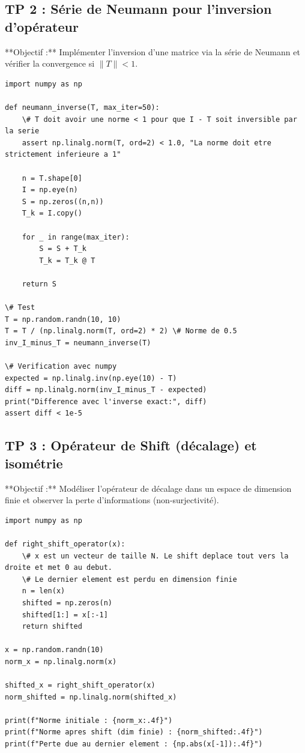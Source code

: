 \documentclass[11pt,a4paper]{article}
\begin{document}
\subsection*{TP 2 : Série de Neumann pour l'inversion d'opérateur}

**Objectif :**
Implémenter l'inversion d'une matrice via la série de Neumann et vérifier la convergence si $\|T\| < 1$.

\begin{lstlisting}
import numpy as np

def neumann_inverse(T, max_iter=50):
    \# T doit avoir une norme < 1 pour que I - T soit inversible par la serie
    assert np.linalg.norm(T, ord=2) < 1.0, "La norme doit etre strictement inferieure a 1"

    n = T.shape[0]
    I = np.eye(n)
    S = np.zeros((n,n))
    T_k = I.copy()

    for _ in range(max_iter):
        S = S + T_k
        T_k = T_k @ T

    return S

\# Test
T = np.random.randn(10, 10)
T = T / (np.linalg.norm(T, ord=2) * 2) \# Norme de 0.5
inv_I_minus_T = neumann_inverse(T)

\# Verification avec numpy
expected = np.linalg.inv(np.eye(10) - T)
diff = np.linalg.norm(inv_I_minus_T - expected)
print("Difference avec l'inverse exact:", diff)
assert diff < 1e-5

\end{lstlisting}


\subsection*{TP 3 : Opérateur de Shift (décalage) et isométrie}

**Objectif :**
Modéliser l'opérateur de décalage dans un espace de dimension finie et observer la perte d'informations (non-surjectivité).

\begin{lstlisting}
import numpy as np

def right_shift_operator(x):
    \# x est un vecteur de taille N. Le shift deplace tout vers la droite et met 0 au debut.
    \# Le dernier element est perdu en dimension finie
    n = len(x)
    shifted = np.zeros(n)
    shifted[1:] = x[:-1]
    return shifted

x = np.random.randn(10)
norm_x = np.linalg.norm(x)

shifted_x = right_shift_operator(x)
norm_shifted = np.linalg.norm(shifted_x)

print(f"Norme initiale : {norm_x:.4f}")
print(f"Norme apres shift (dim finie) : {norm_shifted:.4f}")
print(f"Perte due au dernier element : {np.abs(x[-1]):.4f}")

\end{lstlisting}
\end{document}
